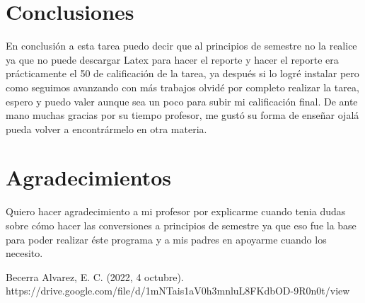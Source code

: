 \documentclass[conference]{IEEEtran}
\begin{document}
\section{Conclusiones}  
En conclusión a esta tarea puedo decir que al principios de semestre no la realice ya que no puede descargar Latex para hacer el reporte y hacer el reporte era prácticamente el 50 de calificación de la tarea, ya después si lo logré instalar pero como seguimos avanzando con más trabajos olvidé por completo realizar la tarea, espero y puedo valer aunque sea un poco para subir mi calificación final. De ante mano muchas gracias por su tiempo profesor, me gustó su forma de enseñar ojalá pueda volver a encontrármelo en otra materia.

\section*{Agradecimientos}
Quiero hacer agradecimiento a mi profesor por explicarme cuando tenia dudas sobre cómo hacer las conversiones a principios de semestre ya que eso fue la base para poder realizar éste programa y a mis padres en apoyarme cuando los necesito.

\begin{thebibliography}{00}
 Becerra Alvarez, E. C. (2022, 4 octubre). https://drive.google.com/file/d/1mNTais1aV0h3mnluL8FKdbOD-9R0n0t/view

\end{thebibliography}
\end{document}
